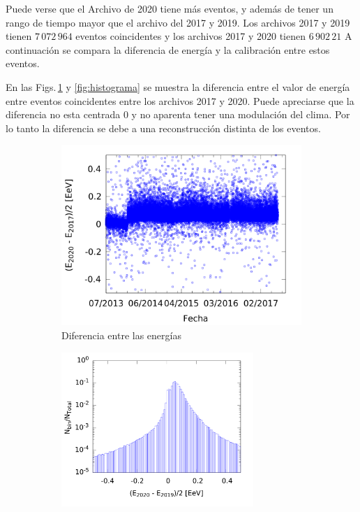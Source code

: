 			Puede verse que el Archivo de 2020 tiene más eventos, y además de tener un rango de tiempo mayor que el archivo del 2017 y 2019. Los archivos 2017 y 2019  tienen $7\,072\,964$ eventos coincidentes y los archivos 2017 y 2020 tienen $6\,902\,21$ A continuación se compara la diferencia de energía y la calibración entre estos eventos.

			En las  Figs.\,\ref{fig:deltaE} y \ref{fig:histograma} se muestra la diferencia entre el valor de energía entre eventos coincidentes entre los archivos 2017 y 2020. Puede apreciarse que la diferencia no esta centrada 0 y no aparenta tener una modulación del clima. Por lo tanto la diferencia se debe a una reconstrucción distinta de los eventos.

					\begin{figure}[H]
						\begin{subfigure}[b]{0.5\textwidth}
							\centering
							\includegraphics[width=\textwidth]{../Anisotropia/comparacion_deltaE.png}
							\caption{Diferencia entre las energías} \label{fig:deltaE}
						\end{subfigure}%
						\begin{subfigure}[b]{0.5\textwidth}
							\centering
							\includegraphics[width=0.8\textwidth]{../Anisotropia/histograma_deltaE.png}

\end{subfigure}
\end{figure}
